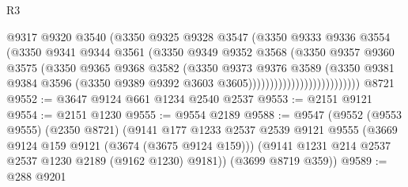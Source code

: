 \begin{lexlean}{R3}
\begin{coremodule}
                                      @9317
                                      @9320
                                      @3540
                                      (@3350
                                        @9325
                                        @9328
                                        @3547
                                        (@3350
                                          @9333
                                          @9336
                                          @3554
                                          (@3350
                                            @9341
                                            @9344
                                            @3561
                                            (@3350
                                              @9349
                                              @9352
                                              @3568
                                              (@3350
                                                @9357
                                                @9360
                                                @3575
                                                (@3350
                                                  @9365
                                                  @9368
                                                  @3582
                                                  (@3350
                                                    @9373
                                                    @9376
                                                    @3589
                                                    (@3350
                                                      @9381
                                                      @9384
                                                      @3596
                                                      (@3350
                                                        @9389
                                                        @9392
                                                        @3603
                                                        @3605))))))))))))))))))))))))))
    @8721
@9552 := @3647 @9124 @661 @1234 @2540 @2537
@9553 := @2151 @9121
@9554 := @2151 @1230
@9555 := @9554 @2189
@9588 := @9547
    (@9552
      (@9553 @9555)
      (@2350 @8721)
      (@9141
        @177
        @1233
        @2537
        @2539
        @9121
        @9555
        (@3669 @9124 @159 @9121 (@3674 (@3675 @9124 @159)))
        (@9141 @1231 @214 @2537 @2537 @1230 @2189 (@9162 @1230) @9181))
      (@3699 @8719 @359))
@9589 := @288 @9201

\end{coremodule}
\end{lexlean}
